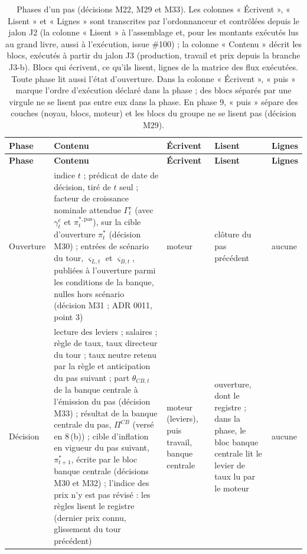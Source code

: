 \documentclass[11pt,a4paper]{article}
\begin{document}
\begin{center}\small
\begin{longtable}{>{\raggedright\arraybackslash}p{2.0cm}>{\raggedright\arraybackslash}p{4.3cm}>{\raggedright\arraybackslash}p{3.2cm}>{\raggedright\arraybackslash}p{2.5cm}>{\raggedright\arraybackslash}p{2.0cm}}
\caption{Phases d'un pas (décisions M22, M29 et M33). Les colonnes « Écrivent », « Lisent » et « Lignes » sont transcrites par l'ordonnanceur et contrôlées depuis le jalon J2 (la colonne « Lisent » à l'assemblage et, pour les montants exécutés lus au grand livre, aussi à l'exécution, issue \#100) ; la colonne « Contenu » décrit les blocs, exécutés à partir du jalon J3 (production, travail et prix depuis la branche J3-b). Blocs qui écrivent, ce qu'ils lisent, lignes de la matrice des flux exécutées. Toute phase lit aussi l'état d'ouverture. Dans la colonne « Écrivent », « puis » marque l'ordre d'exécution déclaré dans la phase ; des blocs séparés par une virgule ne se lisent pas entre eux dans la phase. En phase 9, « puis » sépare des couches (noyau, blocs, moteur) et les blocs du groupe ne se lisent pas (décision M29).}\label{tab:phases}\\
\toprule
\textbf{Phase} & \textbf{Contenu} & \textbf{Écrivent} & \textbf{Lisent} & \textbf{Lignes}\\
\midrule
\endfirsthead
\toprule
\textbf{Phase} & \textbf{Contenu} & \textbf{Écrivent} & \textbf{Lisent} & \textbf{Lignes}\\
\midrule
\endhead
0 Ouverture & indice $t$ ; prédicat de date de décision, tiré de $t$ seul ; facteur de croissance nominale attendue $\Gamma^e_t$ (avec $\gamma^e_t$ et $\pi^{\ast,\mathrm{pas}}_t$), sur la cible d'ouverture $\pi^\ast_t$ (décision M30) ; entrées de scénario du tour, $\varsigma_{L,t}$ et $\varsigma_{B,t}$, publiées à l'ouverture parmi les conditions de la banque, nulles hors scénario (décision M31 ; ADR 0011, point 3) & moteur & clôture du pas précédent & aucune\\
1 Décision & lecture des leviers ; salaires ; règle de taux, taux directeur du tour ; taux neutre retenu par la règle et anticipation du pas suivant ; part $\theta_{\mathit{CB},t}$ de la banque centrale à l'émission du pas (décision M33) ; résultat de la banque centrale du pas, $\Pi^{\mathit{CB}}$ (versé en 8\,(b)) ; cible d'inflation en vigueur du pas suivant, $\pi^\ast_{t+1}$, écrite par le bloc banque centrale (décisions M30 et M32) ; l'indice des prix n'y est pas révisé : les règles lisent le registre (dernier prix connu, glissement du tour précédent) & moteur (leviers), puis travail, banque centrale & ouverture, dont le registre ; dans la phase, le bloc banque centrale lit le levier de taux lu par le moteur & aucune\\

\end{longtable}
\end{center}
\end{document}
